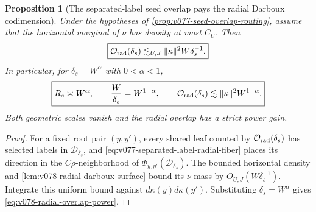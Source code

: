 \documentclass[10pt]{article}
\newtheorem{proposition}[theorem]{Proposition}
\begin{document}
\begin{proposition}[The separated-label seed overlap pays the radial Darboux codimension]
\label{prop:v078-radial-overlap-bound}
Under the hypotheses of \cref{prop:v077-seed-overlap-routing}, assume that the horizontal marginal
of \(\nu\) has density at most \(C_U\).  Then
\begin{equation}
\label{eq:v078-radial-overlap-bound}
\boxed{
\mathcal O_{\rm rad}(\delta_s)
\lesssim_{U,J}
\|\kappa\|^2W\delta_s^{-1}.
}
\end{equation}
In particular, for \(\delta_s=W^\alpha\) with \(0<\alpha<1\),
\begin{equation}
\label{eq:v078-radial-overlap-power}
\boxed{
R_s\asymp W^\alpha,
\qquad
\frac W{\delta_s}=W^{1-\alpha},
\qquad
\mathcal O_{\rm rad}(\delta_s)
\lesssim
\|\kappa\|^2W^{1-\alpha}.
}
\end{equation}
Both geometric scales vanish and the radial overlap has a strict power gain.
\end{proposition}

\begin{proof}
For a fixed root pair \((y,y')\), every shared leaf counted by
\(\mathcal O_{\rm rad}(\delta_s)\) has selected labels in
\(\mathcal D_{\delta_s}\), and \eqref{eq:v077-separated-label-radial-fiber} places its direction
in the \(C\rho\)-neighborhood of
\(\Phi_{y,y'}(\mathcal D_{\delta_s})\).  The bounded horizontal density and
\cref{lem:v078-radial-darboux-surface} bound its \(\nu\)-mass by
\(O_{U,J}(W\delta_s^{-1})\).  Integrate this uniform bound against
\(d\kappa(y)d\kappa(y')\).  Substituting \(\delta_s=W^\alpha\) gives
\eqref{eq:v078-radial-overlap-power}.
\end{proof}
\end{document}
